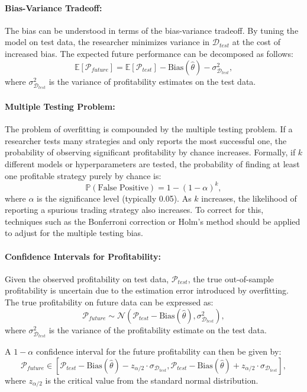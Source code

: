 \paragraph{Bias-Variance Tradeoff:}

The bias can be understood in terms of the bias-variance tradeoff. By tuning the model on test data, the researcher minimizes variance in $\mathcal{D}_{test}$ at the cost of increased bias. The expected future performance can be decomposed as follows:
\[
\mathbb{E}[\mathcal{P}_{future}] = \mathbb{E}[\mathcal{P}_{test}] - \text{Bias}(\hat{\theta}) - \sigma^2_{\mathcal{D}_{test}},
\]
where $\sigma^2_{\mathcal{D}_{test}}$ is the variance of profitability estimates on the test data.

\paragraph{Multiple Testing Problem:}

The problem of overfitting is compounded by the multiple testing problem. If a researcher tests many strategies and only reports the most successful one, the probability of observing significant profitability by chance increases. Formally, if $k$ different models or hyperparameters are tested, the probability of finding at least one profitable strategy purely by chance is:
\[
\mathbb{P}(\text{False Positive}) = 1 - (1 - \alpha)^k,
\]
where $\alpha$ is the significance level (typically 0.05). As $k$ increases, the likelihood of reporting a spurious trading strategy also increases. To correct for this, techniques such as the Bonferroni correction or Holm's method should be applied to adjust for the multiple testing bias.

\paragraph{Confidence Intervals for Profitability:}

Given the observed profitability on test data, $\mathcal{P}_{test}$, the true out-of-sample profitability is uncertain due to the estimation error introduced by overfitting. The true profitability on future data can be expressed as:
\[
\mathcal{P}_{future} \sim \mathcal{N}(\mathcal{P}_{test} - \text{Bias}(\hat{\theta}), \sigma^2_{\mathcal{D}_{test}}),
\]
where $\sigma^2_{\mathcal{D}_{test}}$ is the variance of the profitability estimate on the test data.

A $1 - \alpha$ confidence interval for the future profitability can then be given by:
\[
\mathcal{P}_{future} \in [\mathcal{P}_{test} - \text{Bias}(\hat{\theta}) - z_{\alpha/2} \cdot \sigma_{\mathcal{D}_{test}}, \mathcal{P}_{test} - \text{Bias}(\hat{\theta}) + z_{\alpha/2} \cdot \sigma_{\mathcal{D}_{test}}],
\]
where $z_{\alpha/2}$ is the critical value from the standard normal distribution.

